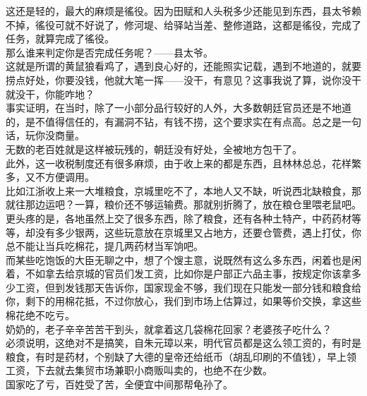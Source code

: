 \begin{multicols}{\theparacolNo}
这还是轻的，最大的麻烦是徭役。因为田赋和人头税多少还能见到东西，县太爷赖不掉，徭役可就不好说了，修河堤、给驿站当差、整修道路，这都是徭役，完成了任务，就算完成了徭役。\\

那么谁来判定你是否完成任务呢？——县太爷。\\

这就是所谓的黄鼠狼看鸡了，遇到良心好的，还能照实记载，遇到不地道的，就要捞点好处，你要没钱，他就大笔一挥——没干，有意见？这事我说了算，说你没干就没干，你能咋地？\\

事实证明，在当时，除了一小部分品行较好的人外，大多数朝廷官员还是不地道的，是不值得信任的，有漏洞不钻，有钱不捞，这个要求实在有点高。总之是一句话，玩你没商量。\\

无数的老百姓就是这样被玩残的，朝廷没有好处，全被地方包干了。\\

此外，这一收税制度还有很多麻烦，由于收上来的都是东西，且林林总总，花样繁多，又不方便调用。\\

比如江浙收上来一大堆粮食，京城里吃不了，本地人又不缺，听说西北缺粮食，那就往那边运吧？一算，粮价还不够运输费。那就别折腾了，放在粮仓里喂老鼠吧。\\

更头疼的是，各地虽然上交了很多东西，除了粮食，还有各种土特产，中药药材等等，却没有多少银两，这些玩意放在京城里又占地方，还要仓管费，遇上打仗，你总不能让当兵吃棉花，提几两药材当军饷吧。\\

而某些吃饱饭的大臣无聊之中，想了个馊主意，说既然有这么多东西，闲着也是闲着，不如拿去给京城的官员们发工资，比如你是户部正六品主事，按规定你该拿多少工资，但到发钱那天告诉你，国家现金不够，我们现在只能发一部分钱和粮食给你，剩下的用棉花抵，不过你放心，我们到市场上估算过，如果等价交换，拿这些棉花绝不吃亏。\\

奶奶的，老子辛辛苦苦干到头，就拿着这几袋棉花回家？老婆孩子吃什么？\\

必须说明，这绝对不是搞笑，自朱元璋以来，明代官员都是这么领工资的，有时是粮食，有时是药材，个别缺了大德的皇帝还给纸币（胡乱印刷的不值钱），早上领工资，下去就去集贸市场兼职小商贩叫卖的，也绝不在少数。\\

国家吃了亏，百姓受了苦，全便宜中间那帮龟孙了。\\


\end{multicols}
